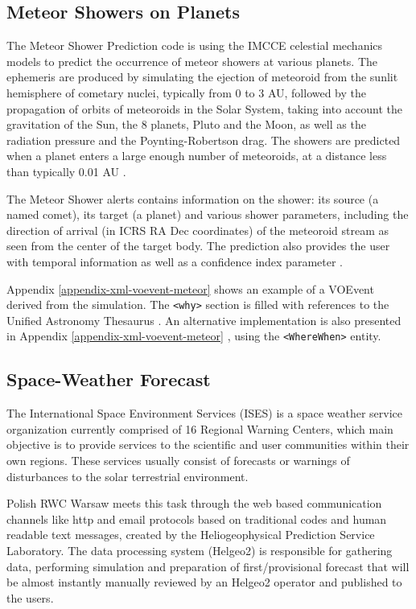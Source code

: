 \documentclass[referee,a4paper,12pt,traditabstract]{swsc}
\begin{document}
\begin{linenumbers}
\subsection{Meteor Showers on Planets}
The Meteor Shower Prediction code is using the IMCCE celestial mechanics models to predict the occurrence of meteor showers at various planets. The ephemeris are produced by simulating the ejection of meteoroid from the sunlit hemisphere of cometary nuclei, typically from 0 to 3 AU, followed by the propagation of orbits of meteoroids in 
the Solar System, taking into account the gravitation of the Sun, the 8 planets, Pluto and the Moon, 
as well as the radiation pressure and the Poynting-Robertson drag. The showers are predicted when a 
 planet enters a large enough number of meteoroids, at a distance less than typically 0.01 AU \cite{2005A&A...439..751V, 2005A&A...439..761V}. 

The Meteor Shower alerts contains information on the shower: its source (a named comet), its target (a planet) and various shower parameters, including the direction of arrival (in ICRS RA Dec coordinates) of the meteoroid stream as seen from the center of the target body. The prediction also provides the user with temporal information as well as a confidence index parameter \cite{2017P&SS..143...78V}.

Appendix \ref{appendix-xml-voevent-meteor} shows an example of a VOEvent derived from the simulation. The {\tt <why>} section is filled with references to the Unified Astronomy Thesaurus \cite{2014ASPC..485..461A}. An alternative implementation is also presented in Appendix \ref{appendix-xml-voevent-meteor} , using the {\tt <WhereWhen>} entity. 

\subsection{Space-Weather Forecast}
The International Space Environment Services (ISES) is a space weather service organization currently comprised of 16 Regional Warning Centers, which main objective is to provide services to the scientific and user communities within their own regions. These services usually consist of forecasts or warnings of disturbances to the solar terrestrial environment.

Polish RWC Warsaw meets this task through the web based communication channels like http and email protocols based on traditional codes and human readable text messages, created by the Heliogeophysical Prediction Service Laboratory. The data processing system (Helgeo2) is responsible for gathering data, performing simulation and preparation of first/provisional forecast that will be almost instantly manually reviewed by an Helgeo2 operator and published to the users. 


\end{linenumbers}
\end{document}
